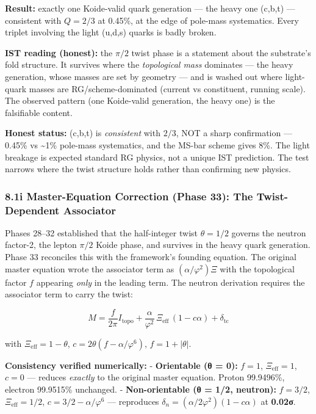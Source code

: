 \documentclass[
]{article}
\begin{document}
\textbf{Result:} exactly one Koide-valid quark generation --- the heavy
one (c,b,t) --- consistent with \(Q = 2/3\) at 0.45\%, at the edge of
pole-mass systematics. Every triplet involving the light (u,d,s) quarks
is badly broken.

\textbf{IST reading (honest):} the \(\pi/2\) twist phase is a statement
about the substrate's fold structure. It survives where the
\emph{topological mass} dominates --- the heavy generation, whose masses
are set by geometry --- and is washed out where light-quark masses are
RG/scheme-dominated (current vs constituent, running scale). The
observed pattern (one Koide-valid generation, the heavy one) is the
falsifiable content.

\textbf{Honest status:} (c,b,t) is \emph{consistent} with \(2/3\), NOT a
sharp confirmation --- 0.45\% vs \textasciitilde1\% pole-mass
systematics, and the MS-bar scheme gives 8\%. The light breakage is
expected standard RG physics, not a unique IST prediction. The test
narrows where the twist structure holds rather than confirming new
physics.

\subsubsection{8.1i Master-Equation Correction (Phase 33): The
Twist-Dependent
Associator}\label{i-master-equation-correction-phase-33-the-twist-dependent-associator}

Phases 28--32 established that the half-integer twist \(\theta = 1/2\)
governs the neutron factor-2, the lepton \(\pi/2\) Koide phase, and
survives in the heavy quark generation. Phase 33 reconciles this with
the framework's founding equation. The original master equation wrote
the associator term as \((\alpha/\varphi^2)\Xi\) with the topological
factor \(f\) appearing \emph{only} in the leading term. The neutron
derivation requires the associator term to carry the twist:

\[M = \frac{f}{2\pi}I_{\text{topo}} + \frac{\alpha}{\varphi^2}\,\Xi_{\text{eff}}\,(1 - c\alpha) + \delta_{\text{tc}}\]

with \(\Xi_{\text{eff}} = 1 - \theta\),
\(c = 2\theta(f - \alpha/\varphi^6)\), \(f = 1 + |\theta|\).

\textbf{Consistency verified numerically:} - \textbf{Orientable (θ =
0):} \(f=1\), \(\Xi_{\text{eff}}=1\), \(c=0\) --- reduces \emph{exactly}
to the original master equation. Proton 99.9496\%, electron 99.9515\%
unchanged. - \textbf{Non-orientable (θ = 1/2, neutron):} \(f = 3/2\),
\(\Xi_{\text{eff}} = 1/2\), \(c = 3/2 - \alpha/\varphi^6\) ---
reproduces \(\delta_n = (\alpha/2\varphi^2)(1-c\alpha)\) at
\textbf{0.02σ}.
\end{document}
